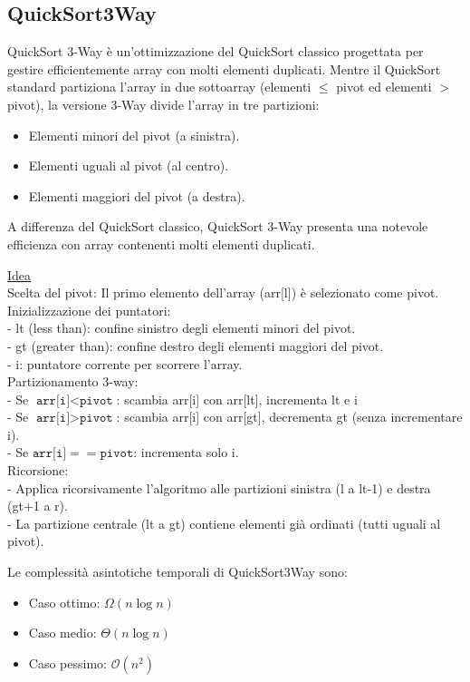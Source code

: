 \documentclass[a4paper, 11pt]{article}
\begin{document}
\subsection{QuickSort3Way}
QuickSort 3-Way è un'ottimizzazione del QuickSort classico progettata per gestire efficientemente array con molti elementi duplicati.  
Mentre il QuickSort standard partiziona l'array in due sottoarray (elementi $\leq$ pivot ed elementi $> $ pivot), la versione 3-Way divide l'array in tre partizioni:
\begin{itemize}
  \item Elementi minori del pivot (a sinistra).
  \item Elementi uguali al pivot (al centro).
  \item Elementi maggiori del pivot (a destra).
\end{itemize}
A differenza del QuickSort classico, QuickSort 3-Way presenta una notevole efficienza con array contenenti molti elementi duplicati.  
\bigbreak

\noindent  \underline{Idea} \\ Scelta del pivot: Il primo elemento dell'array (arr[l]) è selezionato come pivot.\\
Inizializzazione dei puntatori: \\
- lt (less than): confine sinistro degli elementi minori del pivot.\\
- gt (greater than): confine destro degli elementi maggiori del pivot.\\
- i: puntatore corrente per scorrere l'array.\\
Partizionamento 3-way:\\
- Se $ \texttt{arr[i]} < \texttt{pivot} $: scambia arr[i] con arr[lt], incrementa lt e i\\
- Se $ \texttt{arr[i]} > \texttt{pivot} $: scambia arr[i] con arr[gt], decrementa gt (senza incrementare i).\\
- Se $ \texttt{arr[i]} == \texttt{pivot} $: incrementa solo i.\\
Ricorsione:\\
- Applica ricorsivamente l'algoritmo alle partizioni sinistra (l a lt-1) e destra (gt+1 a r).\\
- La partizione centrale (lt a gt) contiene elementi già ordinati (tutti uguali al pivot).\\
\bigskip

Le complessità asintotiche temporali di QuickSort3Way sono:
\begin{itemize}
    \item Caso ottimo: $\Omega(n\log n)$
    \item Caso medio: $\Theta(n\log n)$
    \item Caso pessimo: $\mathcal{O}(n^2)$
\end{itemize}
\end{document}
